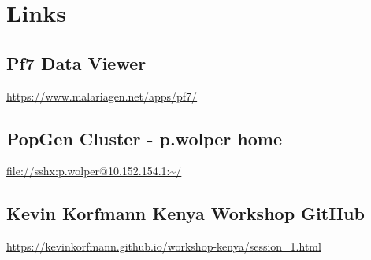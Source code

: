 \documentclass[11pt]{article}
\begin{document}
\section{Links}
\label{sec:org145450a}
\subsection{Pf7 Data Viewer}
\label{sec:orgf166341}
\url{https://www.malariagen.net/apps/pf7/}

\subsection{PopGen Cluster - p.wolper home}
\label{sec:orgacbe780}
\url{file://sshx:p.wolper@10.152.154.1:\~/}

\subsection{Kevin Korfmann Kenya Workshop GitHub}
\label{sec:orgacdc2d8}
\url{https://kevinkorfmann.github.io/workshop-kenya/session\_1.html}
\end{document}
